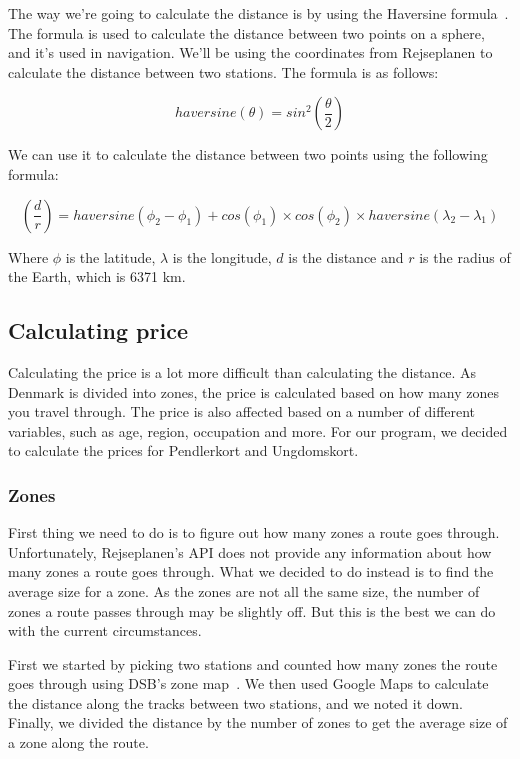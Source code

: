 The way we're going to calculate the distance is by using the Haversine formula~\cite{haversine}.
The formula is used to calculate the distance between two points on a sphere, and it's used in navigation.
We'll be using the coordinates from Rejseplanen to calculate the distance between two stations.
The formula is as follows:

\begin{equation}
    haversine(\theta) = sin^{2}(\frac{\theta}{2})
\end{equation}

We can use it to calculate the distance between two points using the following formula:

\begin{equation}
    (\frac{d}{r}) = haversine(\phi_{2} - \phi_{1}) + cos(\phi_{1}) \times cos(\phi_{2}) \times haversine(\lambda_{2} - \lambda_{1})
\end{equation}

Where \(\phi\) is the latitude, \(\lambda\) is the longitude, \(d\) is the distance and \(r\) is the radius of the
Earth, which is 6371 km.

\subsection{Calculating price}\label{subsec:calculating-price}

Calculating the price is a lot more difficult than calculating the distance.
As Denmark is divided into zones, the price is calculated based on how many zones you travel through.
The price is also affected based on a number of different variables, such as age, region, occupation and more.
For our program, we decided to calculate the prices for Pendlerkort and Ungdomskort.

\subsubsection{Zones}

First thing we need to do is to figure out how many zones a route goes through.
Unfortunately, Rejseplanen's API does not provide any information about how many zones a route goes through.
What we decided to do instead is to find the average size for a zone.
As the zones are not all the same size, the number of zones a route passes through may be slightly off.
But this is the best we can do with the current circumstances.

First we started by picking two stations and counted how many zones the route goes through using DSB's zone
map~\cite{price_zones}.
We then used Google Maps to calculate the distance along the tracks between two stations, and we noted it down.
Finally, we divided the distance by the number of zones to get the average size of a zone along the route.

